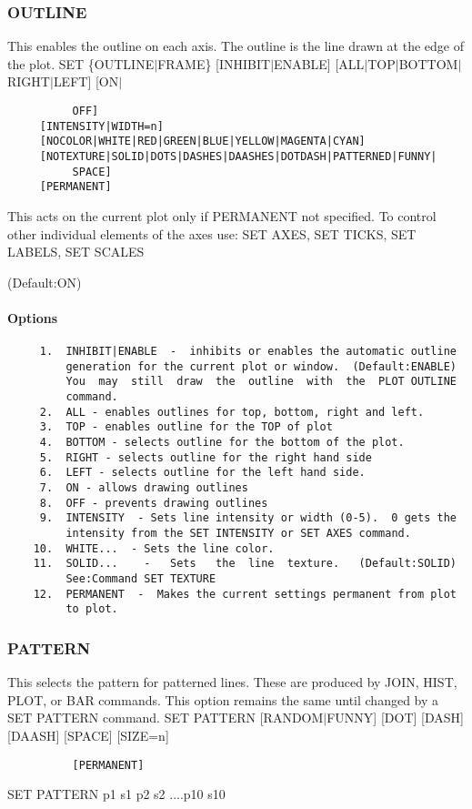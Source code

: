 \subsubsection{OUTLINE}
This  enables  the outline on each axis.  The outline is the line drawn
at the edge of the plot.  
SET \{OUTLINE$|$FRAME\} [INHIBIT$|$ENABLE] [ALL$|$TOP$|$BOTTOM$|$RIGHT$|$LEFT] [ON$|$
\begin{verbatim}
          OFF] 
     [INTENSITY|WIDTH=n] 
     [NOCOLOR|WHITE|RED|GREEN|BLUE|YELLOW|MAGENTA|CYAN] 
     [NOTEXTURE|SOLID|DOTS|DASHES|DAASHES|DOTDASH|PATTERNED|FUNNY|
          SPACE] 
     [PERMANENT] 
\end{verbatim}
This  acts  on  the  current  plot only if PERMANENT not specified.  To
control other individual elements of the axes use:  
SET AXES, SET TICKS, SET LABELS, SET SCALES 

(Default:ON) 
\paragraph{Options}
\begin{verbatim}
     1.  INHIBIT|ENABLE  -  inhibits or enables the automatic outline
         generation for the current plot or window.  (Default:ENABLE)
         You  may  still  draw  the  outline  with  the  PLOT OUTLINE
         command.  
     2.  ALL - enables outlines for top, bottom, right and left.  
     3.  TOP - enables outline for the TOP of plot 
     4.  BOTTOM - selects outline for the bottom of the plot.  
     5.  RIGHT - selects outline for the right hand side 
     6.  LEFT - selects outline for the left hand side.  
     7.  ON - allows drawing outlines 
     8.  OFF - prevents drawing outlines 
     9.  INTENSITY  - Sets line intensity or width (0-5).  0 gets the
         intensity from the SET INTENSITY or SET AXES command.  
    10.  WHITE...  - Sets the line color.  
    11.  SOLID...    -   Sets   the  line  texture.   (Default:SOLID)
         See:Command SET TEXTURE 
    12.  PERMANENT  -  Makes the current settings permanent from plot
         to plot.  
\end{verbatim}

\subsubsection{PATTERN}
This  selects  the  pattern for patterned lines.  These are produced by
JOIN, HIST, PLOT, or BAR commands.  This option remains the same  until
changed by a SET PATTERN command.  
SET PATTERN [RANDOM$|$FUNNY] [DOT] [DASH] [DAASH] [SPACE] [SIZE=n]
\begin{verbatim}
          [PERMANENT] 
\end{verbatim}
SET PATTERN p1 s1 p2 s2 ....p10 s10 

